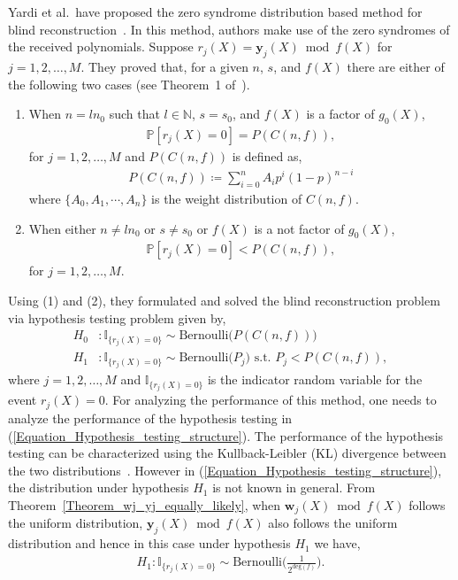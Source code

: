 \documentclass[10pt,journal]{IEEEtran}
\def \deg{{\mathrm{deg}}}
\begin{document}
Yardi et al.~have proposed the zero syndrome distribution based method for blind reconstruction~\cite{TCOMM_2016}.
In this method, authors make use of the zero syndromes of the received polynomials.
Suppose $r_j(X) = \mathbf{y}_j(X) \bmod f(X)$ for $j = 1,2,\ldots,M$.
They proved that, for a given $n$, $s$, and $f(X)$ there are either of the following two cases (see Theorem~1 of~\cite{TCOMM_2016}). 
% 
\begin{enumerate} [(1)]
% 
\item When $n = ln_0$ such that $l \in \mathbb{N}$, $s = s_0$, and $f(X)$ is a factor of $g_0(X)$,
% 
\begin{align*}
\mathbb{P}[r_j(X) = 0] = P(C(n,f)),
\end{align*}
% 
for $j = 1, 2, \ldots, M$ and $P(C(n,f))$ is defined as,
% 
\begin{align}
%  
P(C(n,f)) \coloneqq \sum_{i=0}^n A_i p^i (1-p)^{n-i}
\label{Eqn_PCf_definition}
% 
\end{align}
% 
where $\{ A_0, A_1, \cdots, A_n\}$ is the weight distribution of $C(n,f)$.
% 
\item When either $n \neq ln_0$ or $s \neq s_0$ or $f(X)$ is a not factor of $g_0(X)$,
% 
\begin{align*}
% 
\mathbb{P}[r_j(X) = 0] < P(C(n,f)), 
% 
\end{align*}
% 
for $j = 1, 2, \ldots, M$.
% 
\end{enumerate}
% 

Using (1) and (2), they formulated and solved the blind reconstruction problem via hypothesis testing problem given by,
% 
\begin{equation}
\begin{aligned}
% 
H_0 &: \mathbb{I}_{\{{r}_j(X)=0\}} \sim \mbox{Bernoulli} \Big( P(C(n,f)) \Big) \\
H_1 &: \mathbb{I}_{\{{r}_j(X)=0\}} \sim \mbox{Bernoulli} \Big( P_j \Big) \mbox{ s.t. } P_j < P(C(n,f)), 
%     
\end{aligned}
% 
\label{Equation_Hypothesis_testing_structure}
% 
\end{equation}
% 
where $j = 1, 2, \ldots, M$ and $\mathbb{I}_{\{{r}_j(X)=0\}}$ is the indicator random variable for 
the event $r_j(X) = 0$.
% 
For analyzing the performance of this method, 
one needs to analyze the performance of the hypothesis testing in (\ref{Equation_Hypothesis_testing_structure}).
% 
The performance of the hypothesis testing can be characterized 
using the Kullback-Leibler (KL) divergence between the two distributions~\cite[Ch.~11]{ThomasCover2006}.
However in (\ref{Equation_Hypothesis_testing_structure}), the distribution under hypothesis $H_1$ is not known in general.
From Theorem~\ref{Theorem_wj_yj_equally_likely}, when $\mathbf{w}_j(X) \bmod f(X)$ follows the uniform
distribution, $\mathbf{y}_j(X) \bmod f(X)$ also follows the uniform distribution and hence in this case under hypothesis $H_1$ we have,
% 
\begin{align}
%  
H_1:\mathbb{I}_{\{{r}_j(X)=0\}} \sim \mbox{Bernoulli} \bigg(\frac{1}{2^{\deg(f)}} \bigg).
\label{Equation_equally}
% 
\end{align}
% 
\end{document}
